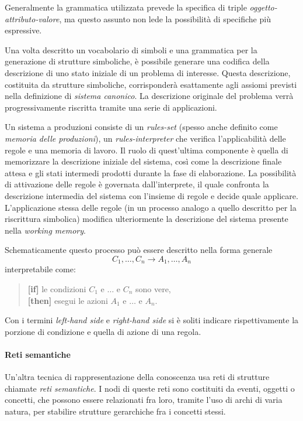 Generalmente la grammatica utilizzata prevede la specifica di triple \emph{oggetto-attributo-valore}, ma questo assunto non lede la possibilità di specifiche più espressive. \cite{jackson1999}

Una volta descritto un vocabolario di simboli e una grammatica per la generazione di strutture simboliche, è possibile generare una codifica della descrizione di uno stato iniziale di un problema di interesse. Questa descrizione, costituita da strutture simboliche, corrisponderà esattamente agli assiomi previsti nella definizione di \emph{sistema canonico}. La descrizione originale del problema verrà progressivamente riscritta tramite una serie di applicazioni.

Un sistema a produzioni consiste di un \emph{rules-set} (spesso anche definito come \emph{memoria delle produzioni}), un \emph{rules-interpreter} che verifica l'applicabilità delle regole e una memoria di lavoro. Il ruolo di quest'ultima componente è quella di memorizzare la descrizione iniziale del sistema, così come la descrizione finale attesa e gli stati intermedi prodotti durante la fase di elaborazione. La possibilità di attivazione delle regole è governata dall'interprete, il quale confronta la descrizione intermedia del sistema con l'insieme di regole e decide quale applicare. L'applicazione stessa delle regole (in un processo analogo a quello descritto per la riscrittura simbolica) modifica ulteriormente la descrizione del sistema presente nella \emph{working memory}.

Schematicamente questo processo può essere descritto nella forma generale
\[
C_1, \dots, C_n \rightarrow A_1, \dots, A_n
\]
interpretabile come:
\begin{quote}
	{\bfseries [if]} le condizioni $C_1$ e $\dots$ e $C_n$ sono vere,\\
	{\bfseries [then]} esegui le azioni $A_1$ e $\dots$ e $A_n$.
\end{quote}

Con i termini \emph{left-hand side} e \emph{right-hand side} si è soliti indicare rispettivamente la porzione di condizione e quella di azione di una regola.

\paragraph{Reti semantiche}
Un'altra tecnica di rappresentazione della conoscenza usa reti di strutture chiamate \emph{reti semantiche}. I nodi di queste reti sono costituiti da eventi, oggetti o concetti, che possono essere relazionati fra loro, tramite l'uso di archi di varia natura, per stabilire strutture gerarchiche fra i concetti stessi.~\cite{development1993}

